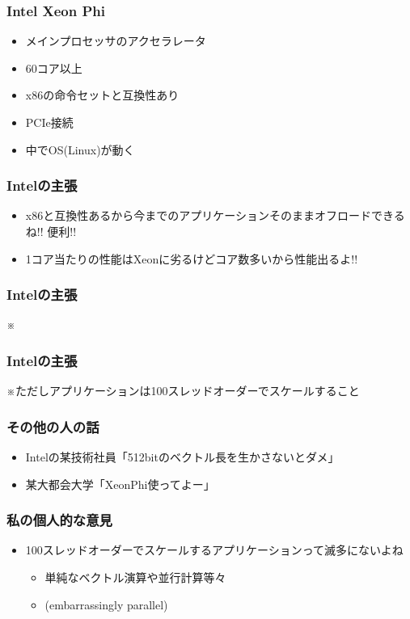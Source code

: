 \documentclass[dvipdfmx,20pt,notheorems,t]{beamer}
\begin{document}
\begin{frame}\frametitle{Intel Xeon Phi}
\begin{itemize}
\item メインプロセッサのアクセラレータ
\item 60コア以上
\item x86の命令セットと互換性あり
\item PCIe接続
\item 中でOS(Linux)が動く
\end{itemize}
\end{frame}

\begin{frame}\frametitle{Intelの主張}
\begin{itemize}
\item x86と互換性あるから今までのアプリケーションそのままオフロードできるね!! 便利!!
\item 1コア当たりの性能はXeonに劣るけどコア数多いから性能出るよ!!
\end{itemize}
\end{frame}

\begin{frame}\frametitle{Intelの主張}
\Large
\centering
\vspace*{\fill}
※
\vspace*{\fill}
\end{frame}

\begin{frame}\frametitle{Intelの主張}
※ただしアプリケーションは100スレッドオーダーでスケールすること
\end{frame}

\begin{frame}\frametitle{その他の人の話}
\begin{itemize}
\item Intelの某技術社員「512bitのベクトル長を生かさないとダメ」
\item 某大都会大学「XeonPhi使ってよー」
\end{itemize}
\end{frame}

\begin{frame}\frametitle{私の個人的な意見}
\begin{itemize}
\item 100スレッドオーダーでスケールするアプリケーションって滅多にないよね
\begin{itemize}
\item 単純なベクトル演算や並行計算等々
\item (embarrassingly parallel)
\end{itemize}
\end{itemize}
\end{frame}
\end{document}
